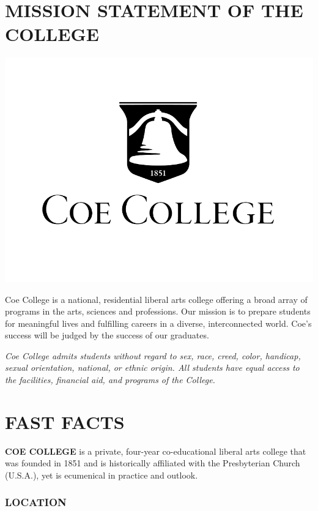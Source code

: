 \documentclass[
  letterpaper,
]{scrbook}
\begin{document}
\chapter{MISSION STATEMENT OF THE
COLLEGE}\label{sec-mission-statement-of-college}

\begin{center}
\includegraphics{catalog_sections/graphics/coe_bell.png}
\end{center}


Coe College is a national, residential liberal arts college offering a
broad array of programs in the arts, sciences and professions. Our
mission is to prepare students for meaningful lives and fulfilling
careers in a diverse, interconnected world. Coe's success will be judged
by the success of our graduates.

\emph{Coe College admits students without regard to sex, race, creed,
color, handicap, sexual orientation, national, or ethnic origin. All
students have equal access to the facilities, financial aid, and
programs of the College.}

\chapter{FAST FACTS}\label{sec-fast-facts}

\textbf{COE COLLEGE} is a private, four-year co-educational liberal arts
college that was founded in 1851 and is historically affiliated with the
Presbyterian Church (U.S.A.), yet is ecumenical in practice and outlook.

\subsection{LOCATION}\label{location}
\end{document}
